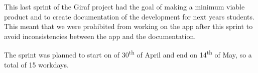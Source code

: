 This last sprint of the Giraf project had the goal of making a minimum viable product and to create documentation of the development for next years students.
This meant that we were prohibited from working on the app after this sprint to avoid inconsistencies between the app and the documentation.

The sprint was planned to start on of 30\textsuperscript{th} of April and end on 14\textsuperscript{th} of May, so a total of 15 workdays.
